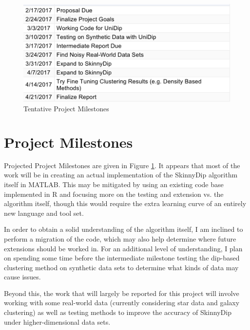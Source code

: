 \documentclass{sig-alternate-05-2015}
\begin{document}
\begin{figure}[t]
\centering
\includegraphics[width=\textwidth]{images/timeline}
\caption{Tentative Project Milestones}
\label{fig:milestones}
\end{figure}

\section{Project Milestones}
Projected Project Milestones are given in Figure \ref{fig:milestones}. It appears that most of the work will be in creating an actual implementation of the SkinnyDip algorithm itself in MATLAB. This may be mitigated by using an existing code base implemented in R and focusing more on the testing and extension vs. the algorithm itself, though this would require the extra learning curve of an entirely new language and tool set. 

In order to obtain a solid understanding of the algorithm itself, I am inclined to perform a migration of the code, which may also help determine where future extensions should be worked in. For an additional level of understanding, I plan on spending some time before the intermediate milestone testing the dip-based clustering method on synthetic data sets to determine what kinds of data may cause issues.

Beyond this, the work that will largely be reported for this project will involve working with some real-world data (currently considering star data and galaxy clustering) as well as testing methods to improve the accuracy of SkinnyDip under higher-dimensional data sets.




\end{document}
